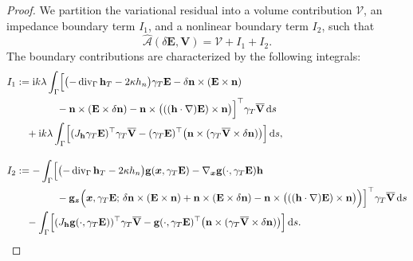 \documentclass[12pt,reqno]{amsart}
\theoremstyle{definition}
\numberwithin{equation}{section}
\begin{document}
\begin{proof}
We partition the variational residual into a volume contribution $\mathscr V$, an impedance boundary term $I_1$, and a nonlinear boundary term $I_2$, such that
\[
\widehat{\mathcal{A}}(\delta\mathbf{E}, \mathbf{V}) = \mathscr V + I_1 + I_2.
\]
The boundary contributions are characterized by the following integrals:
\begin{align*}
I_1 &:= \mathrm{i}k\lambda \int_\Gamma \Bigl[ \bigl( -\operatorname{div}_\Gamma \mathbf{h}_T - 2\kappa h_n \bigr) \gamma_T \mathbf{E} - \delta\mathbf{n} \times (\mathbf{E} \times \mathbf{n}) \\
&\qquad \qquad - \mathbf{n} \times (\mathbf{E} \times \delta\mathbf{n}) - \mathbf{n} \times \bigl( ((\mathbf{h} \cdot \nabla)\mathbf{E}) \times \mathbf{n} \bigr) \Bigr]^{\top} \gamma_T \overline{\mathbf{V}} \,\mathrm{d}s \\
&\quad + \mathrm{i}k\lambda \int_\Gamma \Bigl[ (J_{\mathbf{h}}\gamma_T \mathbf{E})^{\top} \gamma_T\overline{\mathbf{V}} - (\gamma_T \mathbf{E})^{\top} \bigl( \mathbf{n} \times (\gamma_T\overline{\mathbf{V}} \times \delta\mathbf{n}) \bigr) \Bigr] \,\mathrm{d}s, \\[10pt]
I_2 &:= -\int_\Gamma \Bigl[ \bigl( -\operatorname{div}_\Gamma \mathbf{h}_T - 2\kappa h_n \bigr) \mathbf{g}(\boldsymbol{x}, \gamma_T \mathbf{E}) - \nabla_{\boldsymbol{x}}\mathbf{g}(\cdot, \gamma_T \mathbf{E}) \mathbf{h} \\
&\qquad \qquad - \mathbf{g}_{\boldsymbol{z}} \Bigl( \boldsymbol{x}, \gamma_T \mathbf{E}; \, \delta\mathbf{n} \times (\mathbf{E} \times \mathbf{n}) + \mathbf{n} \times (\mathbf{E} \times \delta \mathbf{n}) - \mathbf{n} \times \bigl( ((\mathbf{h} \cdot \nabla)\mathbf{E}) \times \mathbf{n} \bigr) \Bigr) \Bigr]^{\top} \gamma_T \overline{\mathbf{V}} \,\mathrm{d}s \\
&\quad - \int_\Gamma \Bigl[ (J_{\mathbf{h}}\mathbf{g}(\cdot, \gamma_T \mathbf{E}))^{\top} \gamma_T\overline{\mathbf{V}} - \mathbf{g}(\cdot, \gamma_T \mathbf{E})^{\top} \bigl( \mathbf{n} \times (\gamma_T\overline{\mathbf{V}} \times \delta \mathbf{n}) \bigr) \Bigr] \,\mathrm{d}s.
\end{align*}


\end{proof}
\end{document}

